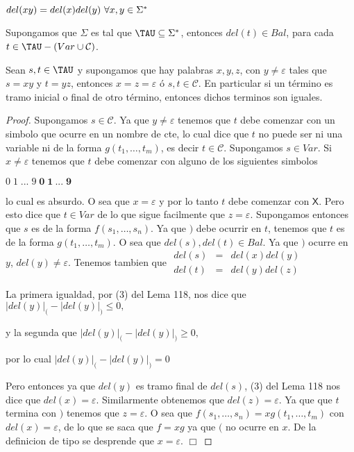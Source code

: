   \begin{lemma}
    \PN $del(xy) = del(x)del(y) \ \forall x, y \in \Sigma^{\ast}$
  \end{lemma}

  \begin{lemma}
    \PN Supongamos que $\Sigma$ es tal que $\TAU \subseteq \SIGMA$, entonces $del(t) \in Bal$, para cada $t \in \TAU -
    (Var \cup \mathcal{C})$.
  \end{lemma}

  \begin{lemma}
    \PN Sean $s, t \in \TAU$ y supongamos que hay palabras $x,y,z$, con $y \neq \varepsilon$ tales que $s=xy$ y $t=yz$,
    entonces $x=z=\varepsilon$ ó $s, t \in \mathcal{C}$. En particular si un término es tramo inicial o final de otro
    término, entonces dichos terminos son iguales.
  \end{lemma}
  \begin{proof}
    Supongamos $s\in \mathcal{C}$. Ya que $y\neq \varepsilon $ tenemos que $t$ debe comenzar con un simbolo que ocurre en un nombre de cte, lo cual dice que $t$ no puede ser ni una variable ni de la forma $g(t_{1}, \dotsc,t_{m})$, es decir $t\in \mathcal{C}$. Supongamos $s\in Var$. Si $x\neq \varepsilon $ tenemos que $t$ debe comenzar con alguno de los siguientes simbolos

    $\displaystyle \mathit{0}\;\mathit{1\;}...\;\mathit{9}\;\mathbf{0}\;\mathbf{1}\ ...\; \mathbf{9} $

    lo cual es absurdo. O sea que $x=\varepsilon $ y por lo tanto $t$ debe comenzar con $\mathsf{X}$. Pero esto dice que $t\in Var$ de lo que sigue facilmente que $z=\varepsilon $. Supongamos entonces que $s$ es de la forma $ f(s_{1}, \dotsc,s_{n})$. Ya que $)$ debe ocurrir en $t$, tenemos que $t$ es de la forma $g(t_{1}, \dotsc,t_{m})$. O sea que $del(s),del(t)\in Bal$. Ya que $)$ ocurre en $y$, $del(y)\neq \varepsilon $. Tenemos tambien que
    $\displaystyle \begin{array}{rcl} del(s) & =& del(x)del(y) \\ del(t) & =& del(y)del(z) \end{array} $

    La primera igualdad, por (3) del Lema 118, nos dice que
    $\displaystyle \lvert del(y)\rvert_{(}-\lvert del(y)\rvert_{)}\leq 0, $

    y la segunda que
    $\displaystyle \lvert del(y)\rvert_{(}-\lvert del(y)\rvert_{)}\geq 0, $

    por lo cual
    $\displaystyle \lvert del(y)\rvert_{(}-\lvert del(y)\rvert_{)}=0 $

    Pero entonces ya que $del(y)$ es tramo final de $del(s)$, (3) del Lema 118 nos dice que $del(x)=\varepsilon $. Similarmente obtenemos que $del(z)=\varepsilon $. Ya que que $t$ termina con $)$ tenemos que $z=\varepsilon $. O sea que $f(s_{1}, \dotsc,s_{n})=xg(t_{1}, \dotsc,t_{m})$ con $del(x)=\varepsilon $, de lo que se saca que $f=xg$ ya que $($ no ocurre en $ x$. De la definicion de tipo se desprende que $x=\varepsilon $. $\Box$
  \end{proof}

